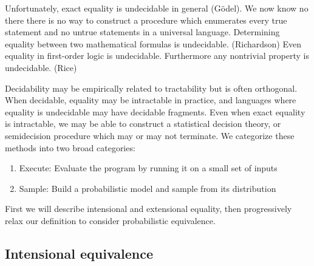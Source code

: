 \documentclass[11pt]{article}
\begin{document}
    Unfortunately, exact equality is undecidable in general (G\"odel). We now know no there there is no way to construct a procedure which enumerates every true statement and no untrue statements in a universal language. Determining equality between two mathematical formulas is undecidable. (Richardson) Even equality in first-order logic is undecidable. Furthermore any nontrivial property is undecidable. (Rice)


    Decidability may be empirically related to tractability but is often orthogonal. When decidable, equality may be intractable in practice, and languages where equality is undecidable may have decidable fragments. Even when exact equality is intractable, we may be able to construct a statistical decision theory, or semidecision procedure which may or may not terminate. We categorize these methods into two broad categories:

    \begin{enumerate}
        \item Execute: Evaluate the program by running it on a small set of inputs
        \item Sample: Build a probabilistic model and sample from its distribution
    \end{enumerate}

   First we will describe intensional and extensional equality, then progressively relax our definition to consider probabilistic equivalence.


%




    \subsection{Intensional equivalence}\label{subsec:intensional-equivalence}
\end{document}
